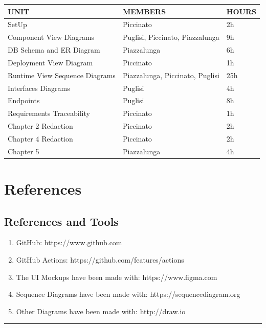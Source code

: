 \documentclass{Configuration_Files/Template}
\begin{document}
\begin{table}[h]
\centering
\begin{tabularx}{\textwidth}{| X | X | X |}
\hline
\textbf{UNIT} & \textbf{MEMBERS} & \textbf{HOURS} \\ [1ex]
\hline
SetUp & Piccinato & 2h \\ [1ex]
\hline
Component View Diagrams & Puglisi, Piccinato, Piazzalunga & 9h \\ [1ex]
\hline
DB Schema and ER Diagram & Piazzalunga & 6h \\ [1ex]
\hline
Deployment View Diagram & Piccinato & 1h \\ [1ex]
\hline
Runtime View Sequence Diagrams & Piazzalunga, Piccinato, Puglisi & 25h \\ [1ex]
\hline
Interfaces Diagrams & Puglisi & 4h \\ [1ex]
\hline
Endpoints & Puglisi & 8h \\ [1ex]
\hline
Requirements Traceability & Piccinato & 1h \\ [1ex]
\hline
Chapter 2 Redaction & Piccinato & 2h \\ [1ex]
\hline
Chapter 4 Redaction & Piccinato & 2h \\ [1ex]
\hline
Chapter 5 & Piazzalunga & 4h \\ [1ex]

\hline
\end{tabularx}
\end{table}

\chapter{References}

\section{References and Tools}

\begin{enumerate}
    \item GitHub: https://www.github.com
    \item GitHub Actions: https://github.com/features/actions
    \item The UI Mockups have been made with: https://www.figma.com
    \item Sequence Diagrams have been made with: https://sequencediagram.org
    \item Other Diagrams have been made with: http://draw.io
\end{enumerate}

{\color{bluepoli}\rule{\linewidth}{0.1pt}}
\end{document}
